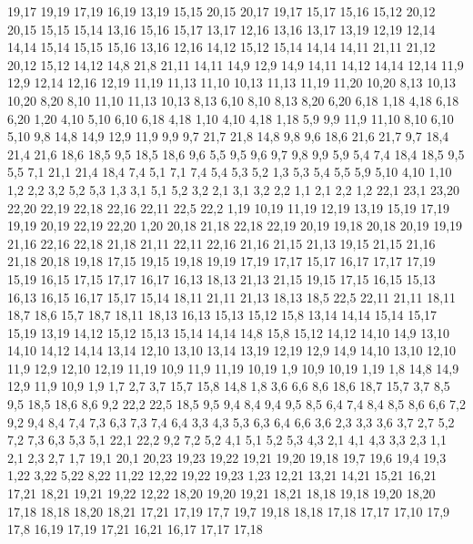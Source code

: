 19,17
19,19
17,19
16,19
13,19
%
15,15
20,15
20,17
19,17
15,17
15,16
%
15,12
20,12
20,15
15,15
15,14
%
13,16
15,16
15,17
13,17
%
12,16
13,16
13,17
13,19
12,19
%
12,14
14,14
15,14
15,15
15,16
13,16
12,16
%
14,12
15,12
15,14
14,14
%
14,11
21,11
21,12
20,12
15,12
14,12
%
14,8
21,8
21,11
14,11
14,9
%
12,9
14,9
14,11
14,12
14,14
12,14
%
11,9
12,9
12,14
12,16
12,19
11,19
11,13
11,10
%
10,13
11,13
11,19
11,20
10,20
%
8,13
10,13
10,20
8,20
%
8,10
11,10
11,13
10,13
8,13
%
6,10
8,10
8,13
8,20
6,20
6,18
%
1,18
4,18
6,18
6,20
1,20
%
4,10
5,10
6,10
6,18
4,18
%
1,10
4,10
4,18
1,18
%
5,9
9,9
11,9
11,10
8,10
6,10
5,10
%
9,8
14,8
14,9
12,9
11,9
9,9
%
9,7
21,7
21,8
14,8
9,8
%
9,6
18,6
21,6
21,7
9,7
%
18,4
21,4
21,6
18,6
18,5
%
9,5
18,5
18,6
9,6
%
5,5
9,5
9,6
9,7
9,8
9,9
5,9
%
5,4
7,4
18,4
18,5
9,5
5,5
%
7,1
21,1
21,4
18,4
7,4
%
5,1
7,1
7,4
5,4
5,3
5,2
%
1,3
5,3
5,4
5,5
5,9
5,10
4,10
1,10
%
1,2
2,2
3,2
5,2
5,3
1,3
%
3,1
5,1
5,2
3,2
%
2,1
3,1
3,2
2,2
%
1,1
2,1
2,2
1,2
22,1
23,1
23,20
22,20
22,19
22,18
22,16
22,11
22,5
22,2
%
1,19
10,19
11,19
12,19
13,19
15,19
17,19
19,19
20,19
22,19
22,20
1,20
%
20,18
21,18
22,18
22,19
20,19
%
19,18
20,18
20,19
19,19
%
21,16
22,16
22,18
21,18
%
21,11
22,11
22,16
21,16
21,15
21,13
%
19,15
21,15
21,16
21,18
20,18
19,18
%
17,15
19,15
19,18
19,19
17,19
17,17
%
15,17
16,17
17,17
17,19
15,19
%
16,15
17,15
17,17
16,17
%
16,13
18,13
21,13
21,15
19,15
17,15
16,15
%
15,13
16,13
16,15
16,17
15,17
15,14
%
18,11
21,11
21,13
18,13
%
18,5
22,5
22,11
21,11
18,11
18,7
18,6
%
15,7
18,7
18,11
18,13
16,13
15,13
15,12
15,8
%
13,14
14,14
15,14
15,17
15,19
13,19
%
14,12
15,12
15,13
15,14
14,14
%
14,8
15,8
15,12
14,12
14,10
14,9
%
13,10
14,10
14,12
14,14
13,14
%
12,10
13,10
13,14
13,19
12,19
%
12,9
14,9
14,10
13,10
12,10
%
11,9
12,9
12,10
12,19
11,19
%
10,9
11,9
11,19
10,19
%
1,9
10,9
10,19
1,19
%
1,8
14,8
14,9
12,9
11,9
10,9
1,9
%
1,7
2,7
3,7
15,7
15,8
14,8
1,8
%
3,6
6,6
8,6
18,6
18,7
15,7
3,7
%
8,5
9,5
18,5
18,6
8,6
%
9,2
22,2
22,5
18,5
9,5
9,4
%
8,4
9,4
9,5
8,5
%
6,4
7,4
8,4
8,5
8,6
6,6
%
7,2
9,2
9,4
8,4
7,4
7,3
%
6,3
7,3
7,4
6,4
%
3,3
4,3
5,3
6,3
6,4
6,6
3,6
%
2,3
3,3
3,6
3,7
2,7
%
5,2
7,2
7,3
6,3
5,3
%
5,1
22,1
22,2
9,2
7,2
5,2
%
4,1
5,1
5,2
5,3
4,3
%
2,1
4,1
4,3
3,3
2,3
%
1,1
2,1
2,3
2,7
1,7
19,1
20,1
20,23
19,23
19,22
19,21
19,20
19,18
19,7
19,6
19,4
19,3
%
1,22
3,22
5,22
8,22
11,22
12,22
19,22
19,23
1,23
%
12,21
13,21
14,21
15,21
16,21
17,21
18,21
19,21
19,22
12,22
%
18,20
19,20
19,21
18,21
%
18,18
19,18
19,20
18,20
%
17,18
18,18
18,20
18,21
17,21
17,19
%
17,7
19,7
19,18
18,18
17,18
17,17
17,10
17,9
17,8
%
16,19
17,19
17,21
16,21
%
16,17
17,17
17,18
